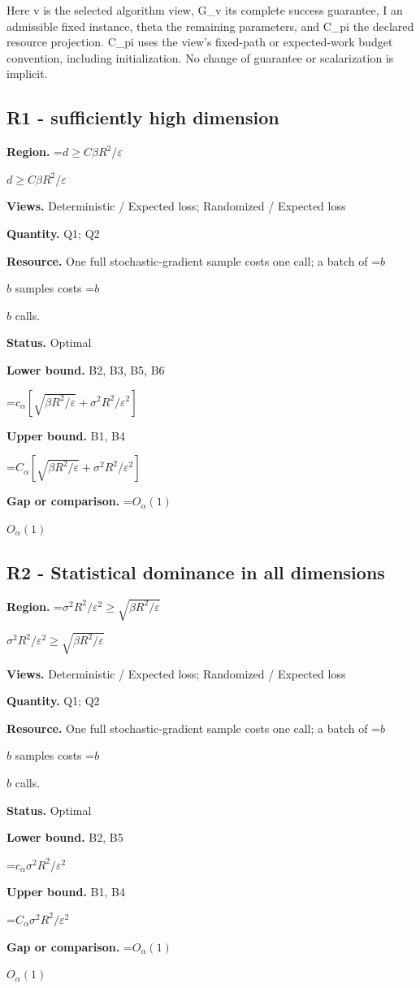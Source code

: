 \documentclass[10pt,a4paper]{article}
\newcommand{\AtlasMath}[1]{\par\begingroup\centering\setbox0=\hbox{$\displaystyle #1$}\ifdim\wd0>1.4\linewidth\typeout{ATLAS WIDE FORMULA: \the\wd0}\fi\ifdim\wd0>\linewidth\resizebox{\linewidth}{!}{\box0}\else\box0\fi\par\endgroup}
\newcommand{\AtlasInlineMath}[1]{\begingroup\setbox0=\hbox{$#1$}\ifdim\wd0>.4\linewidth\endgroup\AtlasMath{#1}\else\endgroup$#1$\fi}
\begin{document}
Here v is the selected algorithm view, G\_v its complete success guarantee, I an admissible fixed instance, theta the remaining parameters, and C\_pi the declared resource projection. C\_pi uses the view's fixed-path or expected-work budget convention, including initialization. No change of guarantee or scalarization is implicit.

\subsection{R1 - sufficiently high dimension}
\textbf{Region.} \AtlasInlineMath{d\ge C\beta R^2/\varepsilon}

\textbf{Views.} Deterministic / Expected loss; Randomized / Expected loss

\textbf{Quantity.} Q1; Q2

\textbf{Resource.} One full stochastic-gradient sample costs one call; a batch of \AtlasInlineMath{b} samples costs \AtlasInlineMath{b} calls.

\textbf{Status.} Optimal

\textbf{Lower bound.} B2, B3, B5, B6

\AtlasMath{c_\alpha[\sqrt{\beta R^2/\varepsilon}+\sigma^2R^2/\varepsilon^2]}
\textbf{Upper bound.} B1, B4

\AtlasMath{C_\alpha[\sqrt{\beta R^2/\varepsilon}+\sigma^2R^2/\varepsilon^2]}
\textbf{Gap or comparison.} \AtlasInlineMath{O_\alpha(1)}

\subsection{R2 - Statistical dominance in all dimensions}
\textbf{Region.} \AtlasInlineMath{\sigma^2R^2/\varepsilon^2\ge \sqrt{\beta R^2/\varepsilon}}

\textbf{Views.} Deterministic / Expected loss; Randomized / Expected loss

\textbf{Quantity.} Q1; Q2

\textbf{Resource.} One full stochastic-gradient sample costs one call; a batch of \AtlasInlineMath{b} samples costs \AtlasInlineMath{b} calls.

\textbf{Status.} Optimal

\textbf{Lower bound.} B2, B5

\AtlasMath{c_\alpha \sigma^2R^2/\varepsilon^2}
\textbf{Upper bound.} B1, B4

\AtlasMath{C_\alpha \sigma^2R^2/\varepsilon^2}
\textbf{Gap or comparison.} \AtlasInlineMath{O_\alpha(1)}
\end{document}
